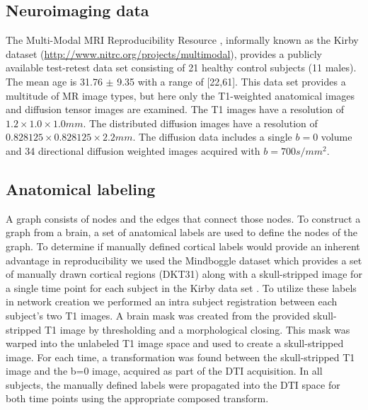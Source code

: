 \documentclass{frontiersSCNS} %
\begin{document}
\subsection{Neuroimaging data}
The Multi-Modal MRI Reproducibility Resource \citep{Landman2011},
informally known as the Kirby dataset (\url{http://www.nitrc.org/projects/multimodal}), 
provides a publicly available test-retest data set consisting of 21
healthy control subjects (11 males). The mean
age is 31.76 $\pm$ 9.35 with a range of [22,61]. This data set provides a
multitude of MR image types, but here only the T1-weighted anatomical images and diffusion
tensor images are examined. The T1 images have a resolution of
$1.2 \times 1.0 \times 1.0 mm$. The distributed diffusion images have a resolution of
$0.828125 \times 0.828125 \times 2.2mm$. The diffusion data includes a single $b=0$
volume and 34 directional diffusion weighted images acquired with
$b=700 s/mm^2$. 

\subsection{Anatomical labeling}
A graph consists of nodes and the edges that connect those nodes. To construct a graph from a brain, a set of anatomical labels
are used to define the nodes of the graph. To determine if manually defined cortical labels would provide an inherent advantage in
reproducibility we used the Mindboggle dataset which provides a set of manually drawn cortical regions (DKT31) 
along with a skull-stripped image for a single time point for each subject in the Kirby data set \citep{Klein2012}. 
To utilize these labels in network creation we performed an intra subject registration between each subject's two T1 images. 
A brain mask was created from the provided skull-stripped T1 image by thresholding and a morphological closing. This mask
was warped into the unlabeled T1 image space and used to create a skull-stripped image. For each time, a transformation was found
between the skull-stripped T1 image and the b=0 image, acquired as part of the DTI acquisition. In all subjects, the manually defined
labels were propagated into the DTI space for both time points using the appropriate composed transform. 
\end{document}
